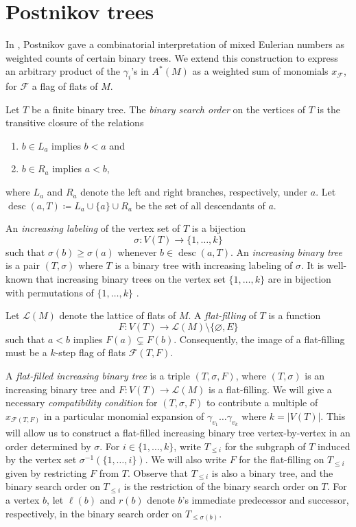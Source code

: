 \documentclass[10pt,a4paper]{amsart}
\numberwithin{equation}{section}
\numberwithin{figure}{section}
\newcommand{\cF}{\mathcal{F}}
\newcommand{\cL}{\mathcal{L}}
\DeclareMathOperator{\desc}{desc}
\theoremstyle{definition}
\theoremstyle{remark}
\begin{document}
\setcounter{section}{4}
\section{Postnikov trees} \label{s:trees}

In \cite[Section 17]{Postnikov:permutohedra}, Postnikov gave a combinatorial interpretation of mixed Eulerian numbers as weighted counts of certain binary trees. We extend this construction to express an arbitrary product of the $\gamma_i$'s in $A^*(M)$ as a weighted sum of monomials $x_{\cF}$, for $\cF$ a flag of flats of $M$.

Let $T$ be a finite binary tree. 
The {\em binary search order} on the vertices of $T$ is the transitive closure of the relations
\begin{enumerate}
    \item $b\in L_a$ implies $b<a$ and
    \item $b\in R_a$ implies $a<b$,
\end{enumerate}
where $L_a$ and $R_a$ denote the left and right branches, respectively, under $a$. 
Let $\desc(a,T)\coloneqq L_a\cup\{a\}\cup R_a$ be the set of all descendants of $a$.

An \emph{increasing labeling} of the vertex set of $T$ is a bijection
\[\sigma\colon V(T) \to \{1,\dots,k\}\]
such that $\sigma(b)\geq \sigma(a)$ whenever $b\in\desc(a,T)$.
An \emph{increasing binary tree} is a pair $(T,\sigma)$ where $T$ is a binary tree with increasing labeling of $\sigma$. It is well-known that increasing binary trees on the vertex set $\{1, \ldots, k\}$ are in bijection with permutations of $\{1, \ldots, k\}$ \cite[Section 1.5]{Stanley}.

Let $\cL(M)$ denote the lattice of flats of $M$. A {\em flat-filling} of $T$ is a function
\[F\colon V(T)\to \cL(M)\setminus\{\varnothing, E\}\]
such that $a<b$ implies $F(a)\subsetneq F(b)$. Consequently, the image of a flat-filling must be a $k$-step flag of flats $\cF(T,F)$.

A {\em flat-filled increasing binary tree} is a triple $(T,\sigma,F)$, where $(T,\sigma)$ is an increasing binary tree and $F\colon V(T)\to \cL(M)$ 
 is a flat-filling. We will give a necessary {\em compatibility condition} for $(T,\sigma,F)$ to contribute a multiple of $x_{\cF(T,F)}$ in a particular monomial expansion of $\gamma_{v_1}\dots\gamma_{v_k}$ where $k=|V(T)|$. This will allow us to construct a flat-filled increasing binary tree vertex-by-vertex in an order determined by $\sigma$. 
For $i \in \{1,\ldots,k\}$, write $T_{\leq i}$ for the subgraph of $T$ induced by the vertex set $\sigma^{-1}(\{1,\ldots,i\})$. We will also write $F$ for the flat-filling on $T_{\leq i}$ given by restricting $F$ from $T$.
Observe that $T_{\leq i}$ is also a binary tree, and the binary search order on $T_{\leq i}$ is the restriction of the binary search order on $T$. For a vertex $b$, let $\ell(b)$ and $r(b)$ denote $b$'s immediate predecessor and successor, respectively, in the binary search order on $T_{\leq \sigma(b)}$.
\end{document}

